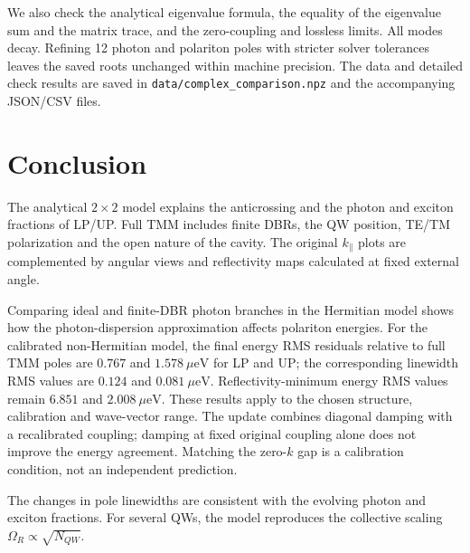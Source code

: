 \documentclass[12pt,a4paper]{article}
\begin{document}
We also check the analytical eigenvalue formula, the equality of the eigenvalue sum and the matrix trace, and the zero-coupling and lossless limits. All modes decay. Refining 12 photon and polariton poles with stricter solver tolerances leaves the saved roots unchanged within machine precision. The data and detailed check results are saved in \texttt{data/complex\_comparison.npz} and the accompanying JSON/CSV files.

\clearpage
\section{Conclusion}

The analytical $2\times2$ model explains the anticrossing and the
photon and exciton fractions of LP/UP. Full TMM includes finite DBRs,
the QW position, TE/TM polarization and the open nature of the cavity.
The original $k_\parallel$ plots are complemented by angular views and
reflectivity maps calculated at fixed external angle.

Comparing ideal and finite-DBR photon branches in the Hermitian model
shows how the photon-dispersion approximation affects polariton energies.
For the calibrated non-Hermitian model, the final energy RMS residuals
relative to full TMM poles are $0.767$ and $1.578\ \mu\mathrm{eV}$ for LP
and UP; the corresponding linewidth RMS values are $0.124$ and
$0.081\ \mu\mathrm{eV}$. Reflectivity-minimum energy RMS values remain
$6.851$ and $2.008\ \mu\mathrm{eV}$. These results apply to the chosen
structure, calibration and wave-vector range. The update combines
diagonal damping with a recalibrated coupling; damping at fixed original
coupling alone does not improve the energy agreement. Matching the
zero-$k$ gap is a calibration condition, not an independent prediction.

The changes in pole linewidths are consistent with the evolving
photon and exciton fractions. For several QWs, the model reproduces
the collective scaling $\Omega_R\propto\sqrt{N_{QW}}$.
\end{document}
